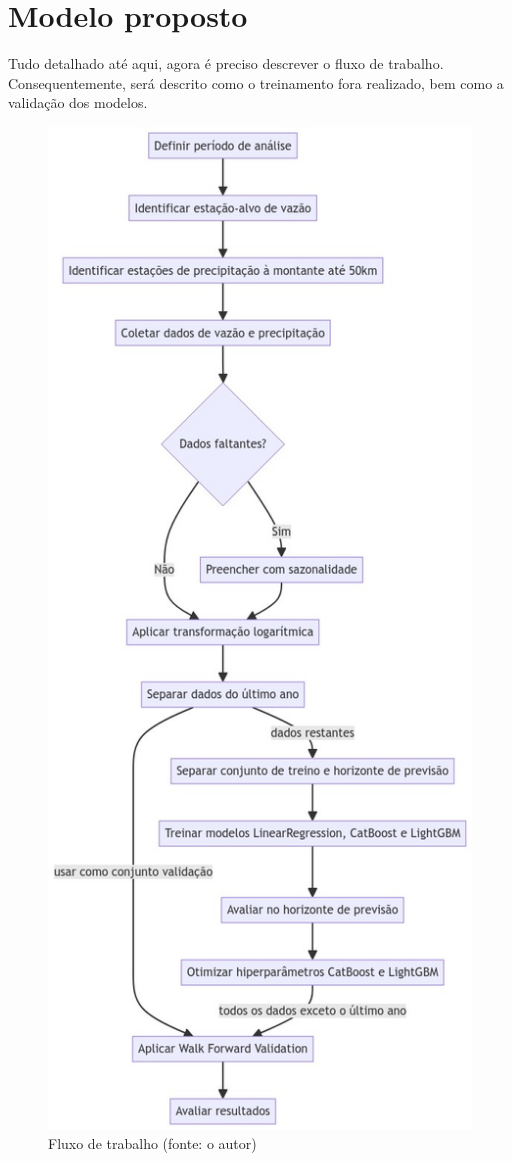 
\section{Modelo proposto}

Tudo detalhado até aqui, agora é preciso descrever o fluxo de trabalho. Consequentemente, será descrito como o treinamento fora realizado, bem como a validação dos modelos.

\begin{figure}[!h]
\centering
\includegraphics[scale=0.4]{Figuras/flowchart.png}
\caption{Fluxo de trabalho (fonte: o autor)}
\label{fig:fluxo_trabalho}
\end{figure}